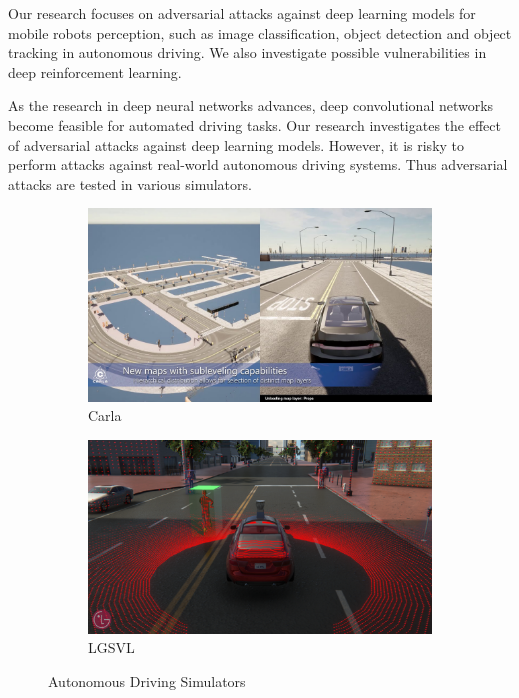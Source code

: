 Our research focuses on adversarial attacks against deep learning models for mobile robots perception, such as image classification, object detection and object tracking in autonomous driving. We also investigate possible vulnerabilities in deep reinforcement learning.



As the research in deep neural networks advances, deep convolutional networks become feasible for automated driving tasks. Our research investigates the effect of adversarial attacks against deep learning models. However, it is risky to perform attacks against real-world autonomous driving systems. Thus adversarial attacks are tested in various simulators.

\begin{figure}[H]
\centering
\begin{subfigure}[b]{0.485\textwidth}
    \centering
    \includegraphics[width=\textwidth]{figures/chapter_intro/carla.jpg}
    \caption{Carla}
    \label{fig:carla_intro}
\end{subfigure}
\hfill
\begin{subfigure}[b]{0.485\textwidth}
    \centering
    \includegraphics[width=\textwidth]{figures/chapter_intro/lgsvl.png}
    \caption{LGSVL}
    \label{fig:lvsvl}
\end{subfigure}
\hfill
\caption{Autonomous Driving Simulators}
\label{fig.simulator}
\end{figure}


